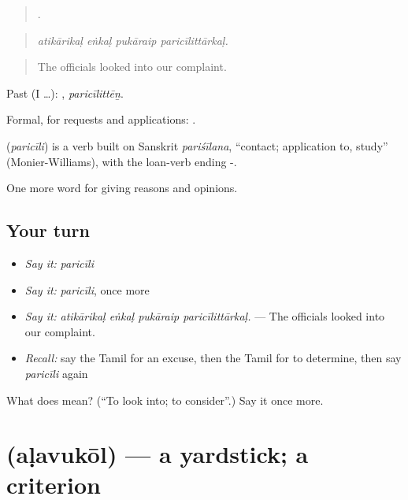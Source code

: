 \begin{quote}
   .
\end{quote}

\begin{quote}
\emph{atikārikaḷ eṅkaḷ pukāraip paricīlittārkaḷ.}
\end{quote}

\begin{quote}
The officials looked into our complaint.
\end{quote}

Past (I …): , \emph{paricīlittēṉ}.

Formal, for requests and applications:  .

\begin{cousinweb}
\textbf{} (\emph{paricīli}) is a verb built on Sanskrit \emph{pariśīlana}, \textquotedblleft{}contact; application to, study\textquotedblright{} (Monier-Williams), with the loan-verb ending -.
\end{cousinweb}

\begin{grammarlens}[title={What you've built}]
One more word for giving reasons and opinions.
\end{grammarlens}

\subsection*{Your turn}
\begin{itemize}
\raggedright
  \item \emph{Say it:} \emph{paricīli}
  \item \emph{Say it:} \emph{paricīli}, once more
  \item \emph{Say it:} \emph{atikārikaḷ eṅkaḷ pukāraip paricīlittārkaḷ.} — The officials looked into our complaint.
  \item \emph{Recall:} say the Tamil for an excuse, then the Tamil for to determine, then say \emph{paricīli} again
\end{itemize}

\begin{tcolorbox}[breakable,colback=teal!4,colframe=teal!35!black,title={Before you move on}]
What does  mean? (\textquotedblleft{}To look into; to consider\textquotedblright{}.) Say it once more.
\end{tcolorbox}
\section[\texorpdfstring{\ta{அளவுகோல்} (aḷavukōl)}{அளவுகோல் (aḷavukōl)}]{ (aḷavukōl) — a yardstick; a criterion}

